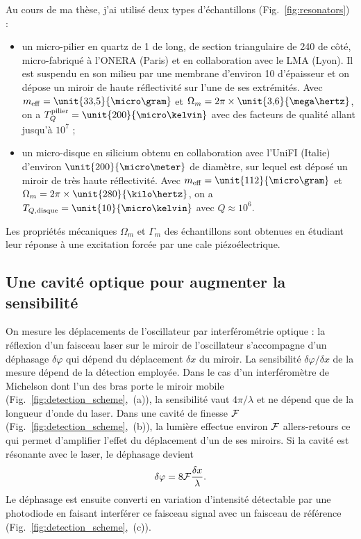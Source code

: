 \documentclass[12pt,a4paper]{article}
\begin{document}
Au cours de ma thèse, j'ai utilisé deux types d'échantillons (Fig.~\ref{fig:resonators}) :
\begin{itemize}
\item un micro-pilier en quartz de \unit{1}{\milli\meter} de long, de section triangulaire de \unit{240}{\micro\meter} de côté, micro-fabriqué à l'ONERA (Paris) et en collaboration avec le LMA (Lyon).
Il est suspendu en son milieu par une membrane d'environ \unit{10}{\micro\meter} d'épaisseur et on dépose un miroir de haute réflectivité sur l'une de ses extrémités.
Avec $m_\mathrm{eff}=\unit{33{,}5}{\micro\gram}$ et $\Omega_m=2\pi\times\unit{3{,}6}{\mega\hertz}$, on a $T_{Q}^\mathrm{pilier} = \unit{200}{\micro\kelvin}$ avec des facteurs de qualité allant jusqu'à $10^7$ ;
\item un micro-disque en silicium obtenu en collaboration avec l'UniFI (Italie) d'environ $\unit{200}{\micro\meter}$ de diamètre, sur lequel est déposé un miroir de très haute réflectivité.
Avec $m_\mathrm{eff}=\unit{112}{\micro\gram}$ et $\Omega_m=2\pi\times\unit{280}{\kilo\hertz}$, on a $T_{Q,\mathrm{disque}} = \unit{10}{\micro\kelvin}$ avec $Q\approx10^6$.
\end{itemize}
Les propriétés mécaniques $\Omega_m$ et $\Gamma_m$ des échantillons sont obtenues en étudiant leur réponse à une excitation forcée par une cale piézoélectrique.

\subsection{Une cavité optique pour augmenter la sensibilité}
\label{sec:cavity}

On mesure les déplacements de l'oscillateur par interférométrie optique : la réflexion d'un faisceau laser sur le miroir de l'oscillateur s'accompagne d'un déphasage $\delta\varphi$ qui dépend du déplacement $\delta x$ du miroir.
La sensibilité $\delta\varphi / \delta x$ de la mesure dépend de la détection employée.
Dans le cas d'un interféromètre de Michelson dont l'un des bras porte le miroir mobile (Fig.~\ref{fig:detection_scheme},~(a)), la sensibilité vaut $4\pi/\lambda$ et ne dépend que de la longueur d'onde du laser.
Dans une cavité de finesse $\cal{F}$ (Fig.~\ref{fig:detection_scheme},~(b)), la lumière effectue environ $\cal{F}$ allers-retours ce qui permet d'amplifier l'effet du déplacement d'un de ses miroirs.
Si la cavité est résonante avec le laser, le déphasage devient
\begin{equation}
\delta \varphi = 8{\cal{F}}\frac{\delta x}{\lambda}.
\end{equation}
Le déphasage est ensuite converti en variation d'intensité détectable par une photodiode en faisant interférer ce faisceau signal avec un faisceau de référence (Fig.~\ref{fig:detection_scheme},~(c)).
\end{document}
